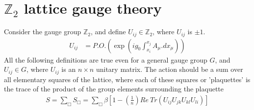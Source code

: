 \documentclass{article}
\begin{document}
\section{$\mathbb{Z}_2$ lattice gauge theory}
Consider the gauge group $\mathbb{Z}_2$, and define $U_{ij}\in \mathbb{Z}_2$, where $U_{ij}$ is $\pm1$. 
\begin{align}
    U_{ij}&=P.O.\left(\exp{\left(ig_0\int_{x_i}^{x_j}A_{\mu}.dx_{\mu}\right)}\right)
\end{align}
All the following definitions are true even for a general gauge group $G$, and $U_{ij}\in G$, where $U_{ij}$ is an $n\times n$ unitary matrix.
The action should be a sum over all elementary squares of the lattice, where each of these squares or 'plaquettes' is the trace of the product of the group elements surrounding the plaquette
\begin{align}
     S=\sum_\Box S_\Box=\sum_\Box \beta\left[1-\left(\frac{1}{n}\right)Re~Tr\left(U_{ij}U_{jk}U_{kl}U_{li}\right)\right]
\end{align}
\end{document}
